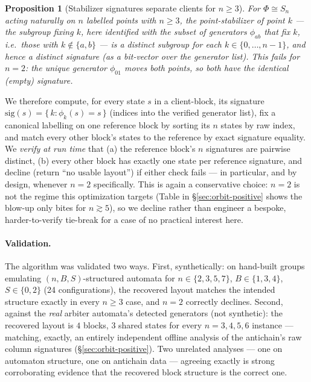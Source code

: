\documentclass[11pt]{article}
\newtheorem{proposition}{Proposition}
\newcommand{\Phigroup}{\Phi}
\begin{document}
\begin{proposition}[Stabilizer signatures separate clients for $n\geq 3$]
\label{prop:stabilizer}
For $\Phigroup \cong S_n$ acting naturally on $n$ labelled points with
$n\geq 3$, the point-stabilizer of point $k$ --- the subgroup fixing $k$,
here identified with the \emph{subset of generators $\phi_{ab}$ that fix
$k$}, i.e.\ those with $k \notin \{a,b\}$ --- is a distinct subgroup for
each $k \in \{0,\dots,n-1\}$, and hence a distinct \emph{signature} (as a
bit-vector over the generator list). This fails for $n=2$: the unique
generator $\phi_{01}$ moves both points, so both have the identical (empty)
signature.
\end{proposition}

We therefore compute, for every state $s$ in a client-block, its signature
$\mathrm{sig}(s) = \{\, k : \phi_k(s) = s \,\}$ (indices into the verified
generator list), fix a canonical labelling on one reference block by
sorting its $n$ states by raw index, and match every other block's states
to the reference by exact signature equality. We \emph{verify at run time}
that (a) the reference block's $n$ signatures are pairwise distinct, (b)
every other block has exactly one state per reference signature, and
decline (return ``no usable layout'') if either check fails --- in
particular, and by design, whenever $n=2$ specifically. This is again a
conservative choice: $n=2$ is not the regime this optimization targets
(Table in \S\ref{sec:orbit-positive} shows the blow-up only bites for
$n\gtrsim 5$), so we decline rather than engineer a bespoke, harder-to-verify
tie-break for a case of no practical interest here.

\paragraph{Validation.} The algorithm was validated two ways. First,
synthetically: on hand-built groups emulating $(n,B,S)$-structured
automata for $n\in\{2,3,5,7\}$, $B\in\{1,3,4\}$, $S\in\{0,2\}$ (24
configurations), the recovered layout matches the intended structure
exactly in every $n\geq3$ case, and $n=2$ correctly declines. Second,
against the \emph{real} arbiter automata's detected generators (not
synthetic): the recovered layout is $4$ blocks, $3$ shared states for
every $n=3,4,5,6$ instance --- matching, exactly, an entirely independent
offline analysis of the antichain's raw column signatures
(\S\ref{sec:orbit-positive}). Two unrelated analyses --- one on automaton
structure, one on antichain data --- agreeing exactly is strong
corroborating evidence that the recovered block structure is the correct
one.
\end{document}
